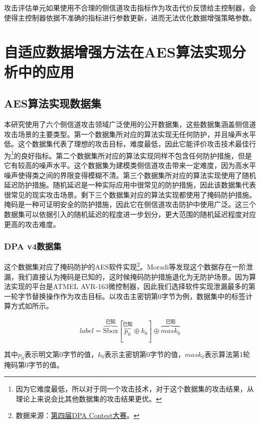{	攻击评估单元如果使用不合理的侧信道攻击指标作为攻击代价反馈给主控制器，会使得主控制器依据不准确的指标进行参数更新，进而无法优化数据增强策略参数。
	\section{自适应数据增强方法在AES算法实现分析中的应用}
	\subsection{AES算法实现数据集}
	
	本研究使用了六个侧信道攻击领域广泛使用的公开数据集，这些数据集涵盖侧信道攻击场景的主要类型。第一个数据集所对应的算法实现无任何防护，并且噪声水平低。这个数据集代表了理想的攻击目标，难度最低，因此它能评价攻击技术最佳行为\footnote{因为它难度最低，所以对于同一个攻击技术，对于这个数据集的攻击结果，从理论上来说会比其他数据集的攻击结果更优。}的良好指标。第二个数据集所对应的算法实现同样不包含任何防护措施，但是它有较高的噪声水平。这个数据集为建模类侧信道攻击带来一定难度，因为高水平噪声使得类之间的界限变得模糊不清。第三个数据集所对应的算法实现使用了随机延迟防护措施。随机延迟是一种实际应用中很常见的防护措施，因此该数据集代表很常见的现实攻击场景。剩下三个数据集对应的算法实现都使用了掩码防护措施。掩码是一种可证明安全的防护措施，因此它在侧信道攻击防护中使用广泛。这三个数据集可以依据引入的随机延迟的程度进一步划分，更大范围的随机延迟程度对应更高的攻击难度。
	
	\subsubsection{DPA v4数据集}
	
	这个数据集对应了掩码防护的AES软件实现\footnote{数据来源：\href{http://www.dpacontest.org/v4}{第四届DPA Contest大赛}。}。Moradi等\citep{Moradi14}发现这个数据存在一阶泄漏，我们直接认为掩码是已知的，这时候掩码防护措施退化为无防护场景。因为算法实现的平台是ATMEL AVR-163微控制器，因此我们选择软件实现泄漏最多的第一轮字节替换操作作为攻击目标。以攻击主密钥第0字节为例，数据集中的标签计算方式如所示。
	
	\begin{equation}\label{eq:dpav4model}
		label=\overbrace{\mathrm{Sbox}}^{\mbox{已知}}[\overbrace{p_0}^{\mbox{已知}}\oplus k_0]\oplus \overbrace{mask_0}^{\mbox{已知}}
	\end{equation}
	
	\noindent 其中$p_0$表示明文第0字节的值，$k_0$表示主密钥第0字节的值，$mask_0$表示算法第1轮掩码第0字节的值。
	
}

